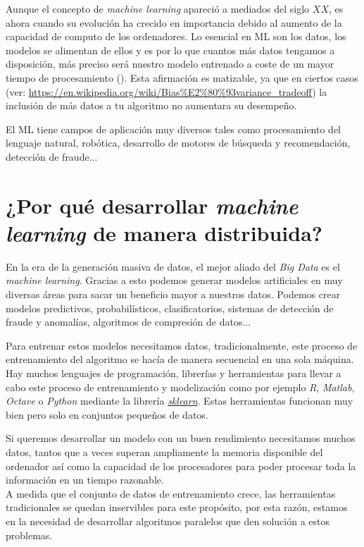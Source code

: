 Aunque el concepto de \textit{machine learning} apareció a mediados del siglo $XX$, es ahora cuando su evolución
ha crecido en importancia debido al aumento de la capacidad de computo de los ordenadores.
Lo esencial en ML son los datos, los modelos se alimentan de ellos y es por lo que cuantos más
datos tengamos a disposición, más preciso será nuestro modelo entrenado a coste de un mayor
tiempo de procesamiento (\cite{DBLP:books/lib/Bishop07}). Esta afirmación es matizable, ya que en ciertos casos 
(ver: \url{https://en.wikipedia.org/wiki/Bias%E2%80%93variance_tradeoff})
la inclusión de más datos a tu algoritmo no aumentara su desempeño.
\newline

El ML tiene campos de aplicación muy diversos tales como procesamiento del lenguaje natural, robótica,
desarrollo de motores de búsqueda y recomendación, detección de fraude...\\

\section[\textit{Machine Learning} distribuido]{¿Por qué desarrollar \textit{machine learning} de manera distribuida?}
En la era de la generación masiva de datos, el mejor aliado del \textit{Big Data} es el \textit{machine learning}.
Gracias a esto podemos generar modelos artificiales en muy diversas áreas para sacar un beneficio
mayor a nuestros datos. Podemos crear modelos predictivos, probabilísticos, clasificatorios,
sistemas de detección de fraude y anomalías, algoritmos de compresión de datos...
\newline

Para entrenar estos modelos necesitamos datos, tradicionalmente, este proceso de entrenamiento
del algoritmo se hacía de manera secuencial en una sola máquina. Hay muchos lenguajes de programación, 
librerías y herramientas para llevar a cabo este proceso de entrenamiento y modelización como por
ejemplo \textit{R}, \textit{Matlab}, \textit{Octave} o \textit{Python} mediante la librería 
\href{http://scikit-learn.org/stable/}{\textit{sklearn}}.
Estas herramientas funcionan muy bien pero solo en conjuntos pequeños de datos.
\newline

Si queremos desarrollar un modelo con un buen rendimiento necesitamos muchos datos, tantos que a veces
superan ampliamente la memoria disponible del ordenador así como la capacidad de los procesadores para
poder procesar toda la información en un tiempo razonable.\\
A medida que el conjunto de datos de entrenamiento crece, las herramientas tradicionales se quedan
inservibles para este propósito, por esta razón, estamos en la necesidad de desarrollar algoritmos
paralelos que den solución a estos problemas.
\newline

